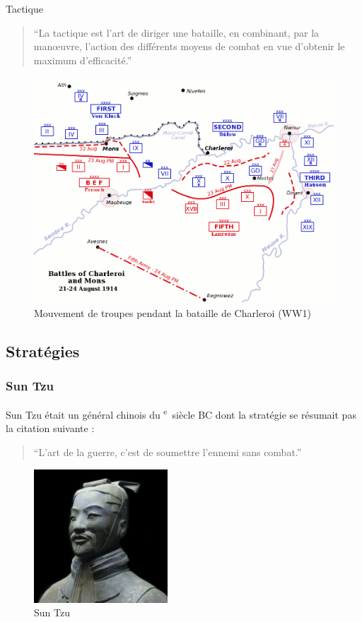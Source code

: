 \documentclass{article}
\newcommand{\cRM}[1]{\MakeUppercase{\romannumeral #1}}  %
\newcommand{\siecle}[1]{\cRM{#1}\textsuperscript{e}~siècle}
\begin{document}
Tactique \cite{tactic}
\begin{quote}“La tactique est l'art de diriger une bataille, en combinant, par la manœuvre, l'action des différents moyens de combat en vue d'obtenir le maximum d'efficacité.”\end{quote}
\begin{figure}[H]
	\begin{centering}
	\includegraphics[width=\linewidth]{../ressources/Battles_of_Charleroi_ww1}
	\caption{Mouvement de troupes pendant la bataille de Charleroi (WW1) \cite{charleroi_battle}}
	\end{centering}
\end{figure}



\subsection{Stratégies}

\subsubsection{Sun Tzu}
Sun Tzu était un général chinois du \siecle{6} BC \cite{sun_tzu_wiki} dont la stratégie se résumait pas la citation suivante : \begin{quote}“L'art de la guerre, c'est de soumettre l'ennemi sans combat.”\end{quote}
\begin{figure}[H]
	\begin{centering}
	\includegraphics[width=5cm]{../ressources/sun_tzu_general}
	\caption{Sun Tzu \cite{sun_tzu_fighting}}
	\end{centering}
\end{figure}
\end{document}
